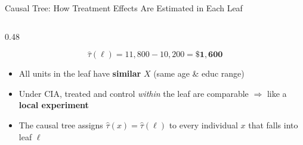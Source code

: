 \documentclass[hyperref={pdfpagelabels=false}]{beamer}
\begin{document}
\begin{frame}{Causal Tree: How Treatment Effects Are Estimated in Each Leaf}
\begin{columns}[T]
\begin{column}{0.48\textwidth}
\begin{itemize}
		\end{itemize}
		\begin{equation*}
			\hat{\tau}(\ell) = 11{,}800 - 10{,}200 = \mathbf{\$1{,}600}
		\end{equation*}
		\vspace{0.15cm}
		\begin{itemize}
			\item All units in the leaf have \textbf{similar} $X$ (same age \& educ range)
			\vspace{0.2cm}
			\item Under CIA, treated and control \textit{within} the leaf are comparable $\Rightarrow$ like a \textbf{local experiment}
			\vspace{0.2cm}
			\item The causal tree assigns $\hat{\tau}(x) = \hat{\tau}(\ell)$ to every individual $x$ that falls into leaf $\ell$
		\end{itemize}
	\end{column}
\end{columns}
\end{frame}
\end{document}
